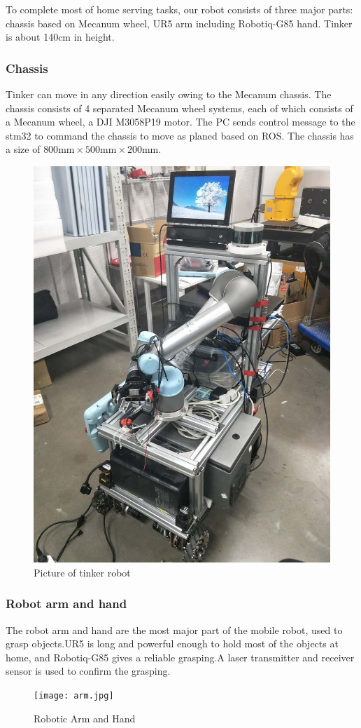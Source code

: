 To complete most of home serving tasks, our robot consists of three major parts: chassis based on Mecanum wheel, UR5 arm including Robotiq-G85 hand. Tinker is about 140cm in height. 
\subsubsection{Chassis}
Tinker can move in any direction easily owing to the Mecanum chassis. The chassis consists of 4 separated Mecanum wheel systems, each of which consists of a Mecanum wheel, a DJI M3058P19 motor. The PC sends control message to the stm32 to command the chassis to move as planed based on ROS. The chassis has a size of $800\text{mm} \times 500\text{mm}\times 200\text{mm}$.
\begin{figure}[!t]
\centering
\includegraphics[scale=0.2]{images/tinker.jpg}
    \caption{Picture of tinker robot}
\end{figure}

\subsubsection{Robot arm and hand}
The robot arm and hand are the most major part of the mobile robot, used to grasp objects.UR5 is long and powerful enough to hold most of the objects at home, and Robotiq-G85 gives a reliable grasping.A laser transmitter and receiver sensor is used to confirm the grasping.
\begin{figure}[!t]
	\centering
    \texttt{[image: arm.jpg]}
    \caption{Robotic Arm and Hand}
\end{figure}

